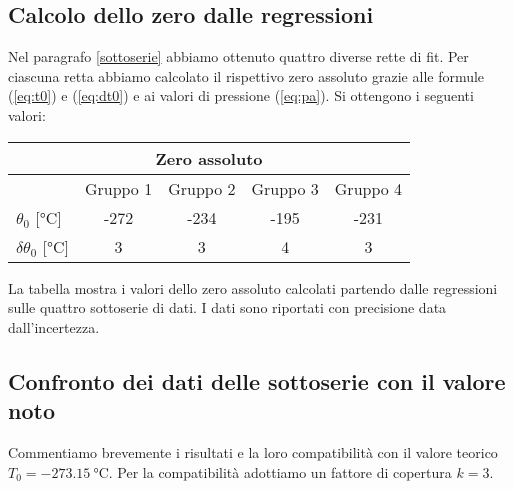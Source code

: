 \subsection{Calcolo dello zero dalle regressioni}

Nel paragrafo {\ref{sottoserie}} abbiamo ottenuto quattro diverse rette di fit. Per ciascuna retta abbiamo calcolato
il rispettivo zero assoluto grazie alle formule (\ref{eq:t0}) e (\ref{eq:dt0}) e ai valori di pressione (\ref{eq:pa}). Si ottengono i seguenti
valori:

\begin{center}
    \begin{tabular}{l c c c c}
        \multicolumn{5}{c}{\textbf{Zero assoluto}} \\
        \toprule
        & Gruppo 1 & Gruppo 2 & Gruppo 3 & Gruppo 4 \\
        \midrule
        $\theta_0$ [\si{\celsius}] & -272 & -234 & -195 & -231 \\
        $\delta \theta_0$ [\si{\celsius}] & 3 & 3 & 4 & 3 \\
        \bottomrule
    \end{tabular}
\end{center}

La tabella mostra i valori dello zero assoluto calcolati partendo dalle regressioni sulle quattro sottoserie di dati.
I dati sono riportati con precisione data dall'incertezza.
  
\subsection{Confronto dei dati delle sottoserie con il valore noto}

Commentiamo brevemente i risultati e la loro compatibilità
con il valore teorico $T_0 = \SI{-273.15}{\celsius}$. Per la compatibilità adottiamo un fattore di copertura $k = 3$.

